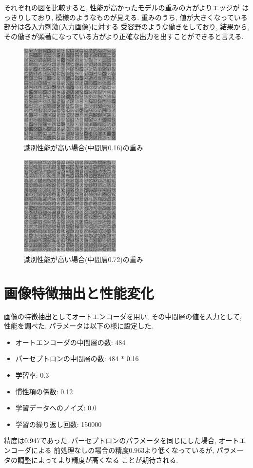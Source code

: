 \documentclass[10pt,a4paper,twocolumn]{jarticle}
\begin{document}
それぞれの図を比較すると, 性能が高かったモデルの重みの方がよりエッジが
はっきりしており, 模様のようなものが見える. 
重みのうち, 値が大きくなっている部分は各入力刺激(入力画像)に対する
受容野のような働きをしており, 結果から, 
その働きが顕著になっている方がより正確な出力を出すことができると言える. 
\begin{figure}[htbp] 
  \centering
  \includegraphics[width=0.45\textwidth]{assets/img/n_hidden_test_mnist_image_nsmpl150000_nh0.16.eps}
  \caption{識別性能が高い場合(中間層0.16)の重み}
  \label{fig:hidden-layer-analyze-img-0.16}
\end{figure}
\begin{figure}[htbp] 
  \centering
  \includegraphics[width=0.45\textwidth]{assets/img/n_hidden_test_mnist_image_nsmpl150000_nh0.72.eps}
  \caption{識別性能が高い場合(中間層0.72)の重み}
  \label{fig:hidden-layer-analyze-img-0.72}
\end{figure}
\section{画像特徴抽出と性能変化}\label{section:feature_test}
画像の特徴抽出としてオートエンコーダを用い, その中間層の値を入力として, 
性能を調べた. パラメータは以下の様に設定した. 
\begin{itemize}
  \item オートエンコーダの中間層の数: 484
  \item パーセプトロンの中間層の数: 484 * 0.16
  \item 学習率: 0.3
  \item 慣性項の係数: 0.12
  \item 学習データへのノイズ: 0.0
  \item 学習の繰り返し回数: 150000
\end{itemize}
精度は0.947であった. パーセプトロンのパラメータを同じにした場合, オートエンコーダによる
前処理なしの場合の精度0.963より低くなっているが, パラメータの調整によってより精度が高くなる
ことが期待される. 
\end{document}
